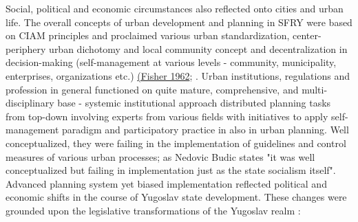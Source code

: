 \documentclass[11pt]{report}
\begin{document}
Social, political and economic circumstances also reflected onto cities and urban life. The overall concepts of urban development and planning in SFRY were based on CIAM principles and proclaimed various urban standardization, center-periphery urban dichotomy and local community concept and decentralization in decision-making (self-management at various levels - community, municipality, enterprises, organizations etc.) \href{}{(Fisher 1962}; \citealt{nedovicbudic_waves_2006}. Urban institutions, regulations and profession in general functioned on quite mature, comprehensive, and multi-disciplinary base - systemic institutional approach distributed planning tasks from top-down involving experts from various fields with initiatives to apply self-management paradigm and participatory practice in also in urban planning. Well conceptualized, they were failing in the implementation of guidelines and control measures of various urban processes; as Nedovic Budic \href{}{\citealt{nedovic-budic_mornings_2011}} states "it was well conceptualized but failing in implementation just as the state socialism itself".
Advanced planning system yet biased implementation reflected political and economic shifts in the course of Yugoslav state development. These changes were grounded upon the legislative transformations of the Yugoslav realm \href{}{\citealt{nedovicbudic_waves_2006}}:
\end{document}
